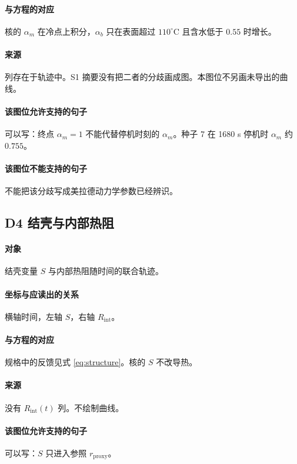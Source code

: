 \paragraph{与方程的对应}
核的 $\alpha_m$ 在冷点上积分，$\alpha_b$ 只在表面超过 $110^\circ\mathrm{C}$ 且含水低于 $0.55$ 时增长。

\paragraph{来源}
列存在于轨迹中。S1 摘要没有把二者的分歧画成图。本图位不另画未导出的曲线。

\paragraph{该图位允许支持的句子}
可以写：终点 $\alpha_m=1$ 不能代替停机时刻的 $\alpha_m$。种子 7 在 1680 s 停机时 $\alpha_m$ 约 $0.755$。

\paragraph{该图位不能支持的句子}
不能把该分歧写成美拉德动力学参数已经辨识。

\subsection{D4 结壳与内部热阻}
\paragraph{对象}
结壳变量 $S$ 与内部热阻随时间的联合轨迹。

\paragraph{坐标与应读出的关系}
横轴时间，左轴 $S$，右轴 $R_{\mathrm{int}}$。

\paragraph{与方程的对应}
规格中的反馈见式 \eqref{eq:structure}。核的 $S$ 不改导热。

\paragraph{来源}
没有 $R_{\mathrm{int}}(t)$ 列。不绘制曲线。

\paragraph{该图位允许支持的句子}
可以写：$S$ 只进入参照 $r_{\mathrm{proxy}}$。

